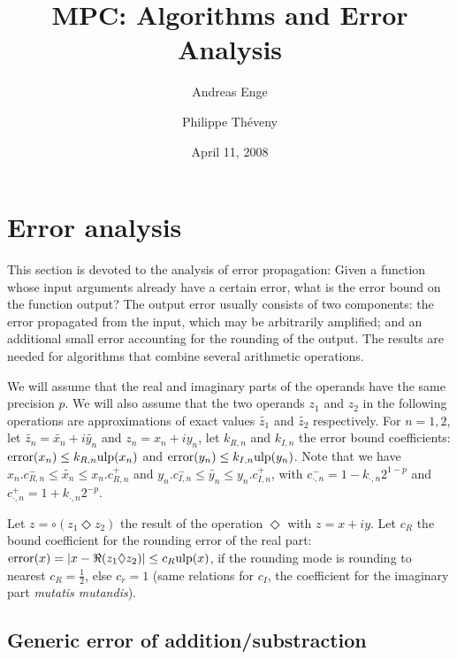 \documentclass {article}
\title {MPC: Algorithms and Error Analysis}
\author {Andreas Enge \and Philippe Th\'eveny}
\date {April 11, 2008}
\DeclareMathOperator{\error}{error}
\newcommand {\Ulp}{{\rm ulp}}
\begin{document}
\maketitle
\tableofcontents


\section {Error analysis}

This section is devoted to the analysis of error propagation: Given a function
whose input arguments already have a certain error, what is the error bound on
the function output? The output error usually consists of two components: the
error propagated from the input, which may be arbitrarily amplified; and an
additional small error accounting for the rounding of the output. The results
are needed for algorithms that combine several arithmetic operations.

We will assume that the real and imaginary parts of the operands have the same
precision $p$.  We will also assume that the two operands $z_1$ and $z_2$ in
the following operations are approximations of exact values $\widetilde{z_1}$
and $\widetilde{z_2}$ respectively. For $n=1, 2$, let $\widetilde{z_n} =
\widetilde{x_n} + i \widetilde{y_n}$ and $z_n = x_n + i y_n$, let $k_{R,n}$
and $k_{I,n}$ the error bound coefficients: $\error(x_n) \leq k_{R,n}
\Ulp(x_n)$ and $\error(y_n) \leq k_{I,n} \Ulp(y_n)$.  Note that we have
$x_n.c_{R,n}^- \leq \widetilde{x_n} \leq x_n.c_{R,n}^+$ and $y_n.c_{I,n}^-
\leq \widetilde{y_n} \leq y_n.c_{I,n}^+$, with $c_{\cdot,n}^- =
1-k_{\cdot,n}2^{1-p}$ and $c_{\cdot,n}^+ = 1+k_{\cdot,n}2^{-p}$.

Let $z=\circ(z_1 \Diamond z_2)$ the result of the operation $\Diamond$ with
$z=x+iy$. Let $c_R$ the bound coefficient for the rounding error of the real
part: $\error(x) = |x-\Re(z_1 \Diamond z_2)| \leq c_R \Ulp(x)$, if the
rounding mode is rounding to nearest $c_R=\frac{1}{2}$, else $c_r=1$ (same
relations for $c_I$, the coefficient for the imaginary part \emph{mutatis
  mutandis}).

\subsection {Generic error of addition/substraction}
\end{document}
